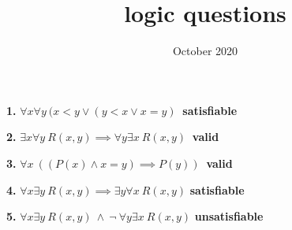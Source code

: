 \documentclass{article}
\title{logic questions}
\date{October 2020}
\begin{document}
\textbf{1.}
$\forall x \forall y \ ( x < y  \lor (y<x \lor x=y) \ $
\textbf{satisfiable} \par
\textbf{2.}
$\exists x \forall y \ R(x,y) \implies \forall y \exists x \ R(x,y) \  $
\textbf{valid} \par
\textbf{3.}
$\forall x \ ((P(x) \land x=y) \implies P(y)) \ $
\textbf{valid} \par 
\textbf{4.}
$\forall x \exists y \ R(x,y) \implies \exists y \forall x \ R(x,y) $
\textbf{satisfiable} \par 
\textbf{5.}
$\forall x \exists y \ R(x,y) \ \land \ \neg \ \forall y \exists x \ R(x,y)$
\textbf{unsatisfiable} \par 
\end{document}
